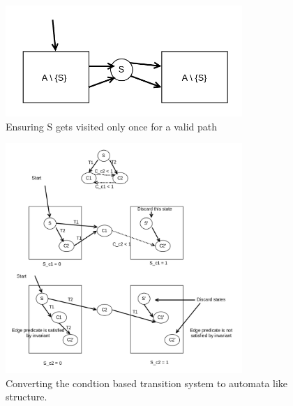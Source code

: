 \begin{figure}
	\centering
	\includegraphics[width=0.8\textwidth]{Figures/automata_state.png}
	\caption{Ensuring S gets visited only once for a valid path}
	\label{fig:ch5example}
\end{figure}


\begin{figure}
	\centering
	\includegraphics[width=0.8\textwidth]{Figures/automata_conv.png}
	\caption{Converting the condtion based transition system to automata like structure.}
	\label{fig:ch5example}
\end{figure}
